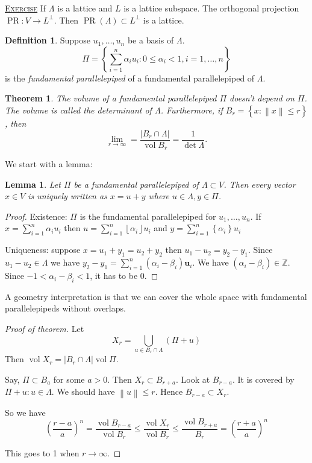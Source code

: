 \documentclass{report}
\newcommand{\Z}{\mathbb{Z}}
\newcommand{\norm}[1]{\left\| #1 \right\|}
\newcommand{\floor}[1]{\left\lfloor #1 \right\rfloor}
\newcommand{\set}[1]{\left\{ #1 \right\}}
\newcommand{\fancyem}[1]{\underline{\textsc{#1}}}
\newtheorem{theorem}{Theorem}[section]
\newtheorem{lemma}{Lemma}[section]
\theoremstyle{definition}
\newtheorem{definition}{Definition}[section]
\theoremstyle{remark}
\numberwithin{equation}{section}
\begin{document}
\fancyem{Exercise} If $\Lambda$ is a lattice and $L$ is a lattice subspace. The orthogonal projection $\operatorname{PR}: V \to L^{\perp}$. Then $\operatorname{PR}(\Lambda) \subset L^\perp$ is a lattice.

\begin{definition}
    Suppose $u_1, \ldots, u_n$ be a basis of $\Lambda$. 
    \[\Pi=\set{\sum_{i=1}^n \alpha_i u_i: 0 \leq \alpha_i < 1, i = 1, \ldots, n}\] is the \emph{fundamental parallelepiped} of a fundamental parallelepiped of $\Lambda$.
\end{definition}
\begin{theorem}
    The volume of a fundamental parallelepiped $\Pi$ doesn't depend on $\Pi$. The volume is called the determinant of $\Lambda$. Furthermore, if $B_{r} = \set{x: \norm{x} \leq r}$, then \[\lim_{r \to \infty} = \frac{|B_r \cap \Lambda|}{\operatorname{vol}B_r} = \frac{1}{\det \Lambda}.\]
\end{theorem}
We start with a lemma:
\begin{lemma}\label{le:1.1.1}
    Let $\Pi$ be a fundamental parallelepiped of $\Lambda \subset V$. Then every vector $x \in V$ is uniquely written as $x = u + y$ where $u \in \Lambda, y \in \Pi$.
\end{lemma}
\begin{proof}
    Existence: $\Pi$ is the fundamental parallelepiped for $u_1, \ldots, u_n$. If $x = \sum_{i=1}^n \alpha_i u_i$ then $u = \sum_{i=1}^n \floor{\alpha_i} u_i$ and $y = \sum_{i=1}^n \set{\alpha_i} u_i$

    Uniqueness: suppose $x = u_1 + y_1 = u_2 + y_2$ then $u_1 - u_2 = y_2 - y_1$. Since $u_1 - u_2 \in \Lambda$ we have $y_2 - y_1 = \sum_{i=1}^n (\alpha_i - \beta_i)\mathbf{u}_i$. We have $(\alpha_i - \beta_i) \in \Z$. Since $-1 < \alpha_i - \beta_i < 1$, it has to be $0$.
\end{proof}
A geometry interpretation is that we can cover the whole space with fundamental parallelepipeds without overlaps.

\newcommand{\vol}{\operatorname{vol}}

\begin{proof}[Proof of theorem]
    Let \[X_{r} = \bigcup_{u \in B_r \cap \Lambda} (\Pi + u)\]
    Then $\operatorname{vol} X_r = |B_r \cap \Lambda| \operatorname{vol}\Pi$.

    Say, $\Pi \subset B_a$ for some $a > 0$. Then $X_r \subset B_{r + a}$.
    Look at $B_{r - a}$. It is covered by $\Pi + u: u \in \Lambda$. We should have $\norm{u} \leq r$. Hence $B_{r - a} \subset X_r$.

    So we have \[\left(\frac{r-a}{a}\right)^n = \frac{\vol B_{r-a}}{\vol B_r} \leq \frac{\vol X_r}{\vol B_r} \leq \frac{\vol B_{r+a}}{B_r} = \left(\frac{r+a}{a}\right)^n\]

    This goes to 1 when $r \to \infty$.
\end{proof}
\end{document}
